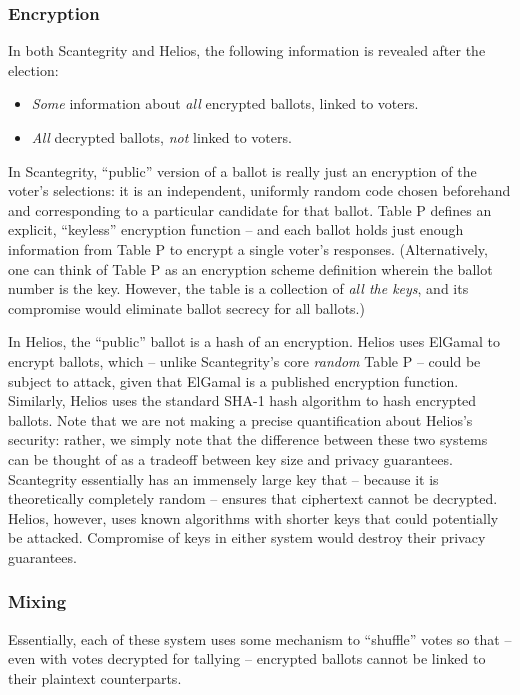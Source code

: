 \documentclass[10pt,twocolumn]{article}
\begin{document}
\subsubsection{Encryption}

In both Scantegrity and Helios, the following information is revealed after the election:
\begin{itemize}
	\item
		\emph{Some} information about \emph{all} encrypted ballots, linked to voters.
	\item
		\emph{All} decrypted ballots, \emph{not} linked to voters.
\end{itemize}

In Scantegrity, ``public'' version of a ballot is really just an encryption of the voter's
selections: it is an independent, uniformly random code chosen beforehand and corresponding to a
particular candidate for that ballot. Table P defines an explicit, ``keyless'' encryption
function -- and each ballot holds just enough information from Table P to encrypt a single voter's
responses. (Alternatively, one can think of Table P as an encryption scheme definition wherein the
ballot number is the key. However, the table is a collection of \emph{all the keys}, and its
compromise would eliminate ballot secrecy for all ballots.)

In Helios, the ``public'' ballot is a hash of an encryption. Helios uses ElGamal to encrypt ballots,
which -- unlike Scantegrity's core \emph{random} Table P -- could be subject to attack, given that
ElGamal is a published encryption function. Similarly, Helios uses the standard SHA-1 hash algorithm
to hash encrypted ballots. Note that we are not making a precise quantification about Helios's
security: rather, we simply note that the difference between these two systems can be thought of as
a tradeoff between key size and privacy guarantees. Scantegrity essentially has an immensely large
key that -- because it is theoretically completely random -- ensures that ciphertext cannot be
decrypted. Helios, however, uses known algorithms with shorter keys that could potentially be
attacked. Compromise of keys in either system would destroy their privacy guarantees.

\subsubsection{Mixing}

Essentially, each of these system uses some mechanism to ``shuffle'' votes so that -- even
with votes decrypted for tallying -- encrypted ballots cannot be linked to their plaintext
counterparts.
\end{document}
